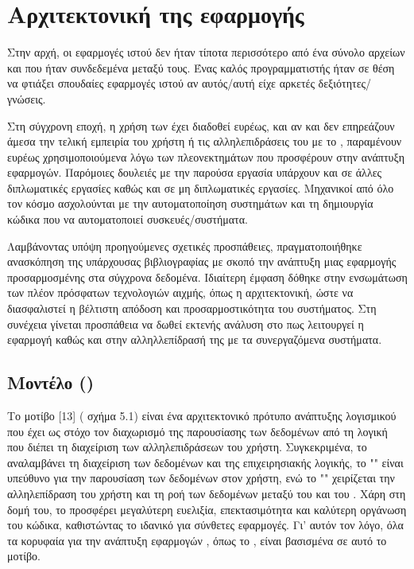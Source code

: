 \section{Αρχιτεκτονική της εφαρμογής}

Στην αρχή, οι εφαρμογές ιστού δεν ήταν τίποτα περισσότερο από ένα σύνολο αρχείων  και
 που ήταν συνδεδεμένα μεταξύ τους. Ένας καλός προγραμματιστής ήταν σε θέση να φτιάξει σπουδαίες εφαρμογές ιστού αν αυτός/αυτή
είχε αρκετές δεξιότητες/γνώσεις.

Στη σύγχρονη εποχή, η χρήση των  έχει διαδοθεί ευρέως, και αν και δεν επηρεάζουν άμεσα την τελική εμπειρία του χρήστη ή τις αλληλεπιδράσεις του με το , παραμένουν ευρέως χρησιμοποιούμενα λόγω των πλεονεκτημάτων που προσφέρουν στην ανάπτυξη εφαρμογών.
Παρόμοιες δουλειές με την παρούσα εργασία υπάρχουν και σε άλλες διπλωματικές εργασίες καθώς και σε μη διπλωματικές εργασίες. Μηχανικοί από όλο τον κόσμο
ασχολούνται με την αυτοματοποίηση συστημάτων και τη δημιουργία κώδικα που να αυτοματοποιεί συσκευές/συστήματα. 

Λαμβάνοντας υπόψη προηγούμενες σχετικές προσπάθειες, πραγματοποιήθηκε ανασκόπηση της υπάρχουσας βιβλιογραφίας με σκοπό την ανάπτυξη μιας εφαρμογής προσαρμοσμένης στα σύγχρονα δεδομένα. Ιδιαίτερη έμφαση δόθηκε στην ενσωμάτωση των πλέον πρόσφατων τεχνολογιών αιχμής, όπως η  αρχιτεκτονική, ώστε να διασφαλιστεί η βέλτιστη απόδοση και προσαρμοστικότητα του συστήματος. Στη συνέχεια γίνεται προσπάθεια να δωθεί εκτενής
ανάλυση στο πως λειτουργεί η εφαρμογή καθώς και στην αλληλλεπίδρασή της με τα συνεργαζόμενα συστήματα. 
 
\subsection{Μοντέλο  ()}

Το μοτίβο [13] ( σχήμα 5.1) είναι ένα αρχιτεκτονικό πρότυπο ανάπτυξης λογισμικού που έχει ως στόχο τον διαχωρισμό της παρουσίασης των δεδομένων από τη λογική που διέπει τη διαχείριση των αλληλεπιδράσεων του χρήστη. Συγκεκριμένα, το  αναλαμβάνει τη διαχείριση των δεδομένων και της επιχειρησιακής λογικής, το "" είναι υπεύθυνο για την παρουσίαση των δεδομένων στον χρήστη, ενώ το "" χειρίζεται την αλληλεπίδραση του χρήστη και τη ροή των δεδομένων μεταξύ του  και του .
Χάρη στη δομή του, το  προσφέρει μεγαλύτερη ευελιξία, επεκτασιμότητα και καλύτερη οργάνωση του κώδικα, καθιστώντας το ιδανικό για σύνθετες εφαρμογές. Γι’ αυτόν τον λόγο, όλα τα κορυφαία  για την ανάπτυξη εφαρμογών , όπως το , είναι βασισμένα σε αυτό το μοτίβο.


